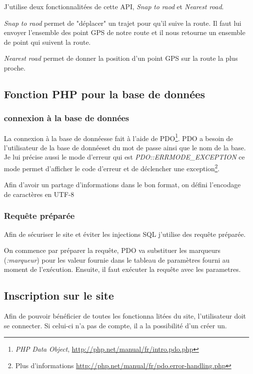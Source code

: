 \documentclass[a4paper]{article}
\newcommand{\bdd}{base de données}
\begin{document}
J'utilise deux fonctionnalitées de cette API, \emph{Snap to raod} et \emph{Nearest road}.

\emph{Snap to raod} permet de "déplacer" un trajet pour qu'il suive la route. Il faut lui envoyer l'ensemble des point GPS de notre route et il nous retourne un ensemble de point qui suivent la route.

\emph{Nearest road} permet de donner la position d'un point GPS sur la route la plus proche.

\subsection{Fonction PHP pour la \bdd}
\subsubsection{connexion à la \bdd}
La connexion à la \bdd se fait à l'aide de PDO\footnote{\emph{PHP Data Object}, \url{http://php.net/manual/fr/intro.pdo.php}}. PDO a besoin de l'utilisateur de la \bdd et du mot de passe ainsi que le nom de la base.
Je lui précise aussi le mode d'erreur qui est \emph{PDO::ERRMODE\_EXCEPTION} ce mode permet d'afficher le code d'erreur et de déclencher une exception\footnote{Plus d'informations \url{http://php.net/manual/fr/pdo.error-handling.php}}.

Afin d'avoir un partage d'informations dans le bon format, on défini l'encodage de caractères en UTF-8

%
\subsubsection{Requête préparée}
Afin de sécuriser le site et éviter les injections SQL j'utilise des requête préparée.

On commence par préparer la requête, PDO va substituer les marqueurs (\emph{:marqueur}) pour les valeur fournie dans le tableau de paramètres fourni au moment de l'exécution. Ensuite, il faut exécuter la requête avec les parametres.
%


\newpage
\subsection{Inscription sur le site}

Afin de pouvoir bénéficier de toutes les fonctionna litées du site, l'utilisateur doit se connecter. Si celui-ci n'a pas de compte, il a la possibilité d'un créer un. 
\end{document}

